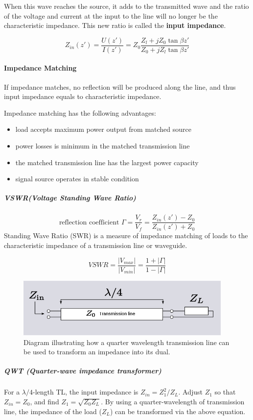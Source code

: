 When this wave reaches the source, it adds to the transmitted wave and the ratio of the voltage and current at the input to the line will no longer be the characteristic impedance. This new ratio is called the \textbf{input impedance}.

$$Z_{in}(z')=\frac{U(z')}{I(z')}=Z_0\frac{Z_l+jZ_0\tan\beta z'}{Z_0+jZ_l\tan\beta z'}$$

\paragraph{Impedance Matching}

If impedance matches, no reflection will be produced along the line, and thus input impedance equals to characteristic impedance.

Impedance matching has the following advantages:
\begin{itemize}
  \item load accepts maximum power output from matched source
  \item power losses is minimum in the matched transmission line
  \item the matched transmission line has the largest power capacity
  \item signal source operates in stable condition
\end{itemize}

\subparagraph{VSWR(Voltage Standing Wave Ratio)}
$$\textrm{reflection coefficient }\Gamma = \frac{V_r}{V_f}=\frac{Z_{in}(z')-Z_0}{Z_{in}(z')+Z_0}$$
Standing Wave Ratio (SWR) is a measure of impedance matching of loads to the characteristic impedance of a transmission line or waveguide.

$$VSWR=\frac{|V_{max}|}{|V_{min}|}=\frac{1+|\Gamma|}{1-|\Gamma|}$$

\begin{figure}
  \centering
  \includegraphics[width=4.2in]{fig/800px-Quarter_wave_impedance_transformer.svg.png}
  \caption{Diagram illustrating how a quarter wavelength transmission line can be used to transform an impedance into its dual.}\label{fig_quarter_wave}
\end{figure}

\subparagraph{QWT (Quarter-wave impedance transformer)} For a $\lambda /4$-length TL, the input impedance is $Z_{in}=Z_1^2 / Z_L$. Adjust $Z_1$ so that $Z_{in}=Z_0$, and find $Z_1=\sqrt{Z_0Z_L}$. By using a quarter-wavelength of transmission line, the impedance of the load ($Z_L$) can be transformed via the above equation.

